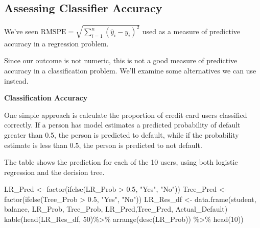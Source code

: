 \documentclass[
  letterpaper,
  DIV=11,
  numbers=noendperiod]{scrreprt}
\newenvironment{Shaded}{\begin{snugshade}}{\end{snugshade}}
\newcommand{\DecValTok}[1]{\textcolor[rgb]{0.68,0.00,0.00}{#1}}
\newcommand{\FloatTok}[1]{\textcolor[rgb]{0.68,0.00,0.00}{#1}}
\newcommand{\FunctionTok}[1]{\textcolor[rgb]{0.28,0.35,0.67}{#1}}
\newcommand{\NormalTok}[1]{\textcolor[rgb]{0.00,0.23,0.31}{#1}}
\newcommand{\OtherTok}[1]{\textcolor[rgb]{0.00,0.23,0.31}{#1}}
\newcommand{\SpecialCharTok}[1]{\textcolor[rgb]{0.37,0.37,0.37}{#1}}
\newcommand{\StringTok}[1]{\textcolor[rgb]{0.13,0.47,0.30}{#1}}
\begin{document}
\subsection{Assessing Classifier
Accuracy}\label{assessing-classifier-accuracy}

We've seen
\(\text{RMSPE} = \sqrt{\displaystyle\sum_{i=1}^{n}{(\hat{y}_i-y_i)^2}}\)
used as a measure of predictive accuracy in a regression problem.

Since our outcome is not numeric, this is not a good measure of
predictive accuracy in a classification problem. We'll examine some
alternatives we can use instead.

\textbf{Classification Accuracy}

One simple approach is calculate the proportion of credit card users
classified correctly. If a person has model estimates a predicted
probability of default greater than 0.5, the person is predicted to
default, while if the probability estimate is less than 0.5, the person
is predicted to not default.

The table shows the prediction for each of the 10 users, using both
logistic regression and the decision tree.

\begin{Shaded}
\begin{Highlighting}[]
\NormalTok{LR\_Pred }\OtherTok{\textless{}{-}} \FunctionTok{factor}\NormalTok{(}\FunctionTok{ifelse}\NormalTok{(LR\_Prob }\SpecialCharTok{\textgreater{}} \FloatTok{0.5}\NormalTok{, }\StringTok{"Yes"}\NormalTok{, }\StringTok{"No"}\NormalTok{))}
\NormalTok{Tree\_Pred }\OtherTok{\textless{}{-}} \FunctionTok{factor}\NormalTok{(}\FunctionTok{ifelse}\NormalTok{(Tree\_Prob }\SpecialCharTok{\textgreater{}} \FloatTok{0.5}\NormalTok{, }\StringTok{"Yes"}\NormalTok{, }\StringTok{"No"}\NormalTok{))}
\NormalTok{LR\_Res\_df }\OtherTok{\textless{}{-}} \FunctionTok{data.frame}\NormalTok{(student, balance, LR\_Prob, Tree\_Prob, LR\_Pred,Tree\_Pred, Actual\_Default)}
\FunctionTok{kable}\NormalTok{(}\FunctionTok{head}\NormalTok{(LR\_Res\_df, }\DecValTok{50}\NormalTok{)}\SpecialCharTok{\%\textgreater{}\%} \FunctionTok{arrange}\NormalTok{(}\FunctionTok{desc}\NormalTok{(LR\_Prob)) }\SpecialCharTok{\%\textgreater{}\%} \FunctionTok{head}\NormalTok{(}\DecValTok{10}\NormalTok{))}
\end{Highlighting}
\end{Shaded}
\end{document}
